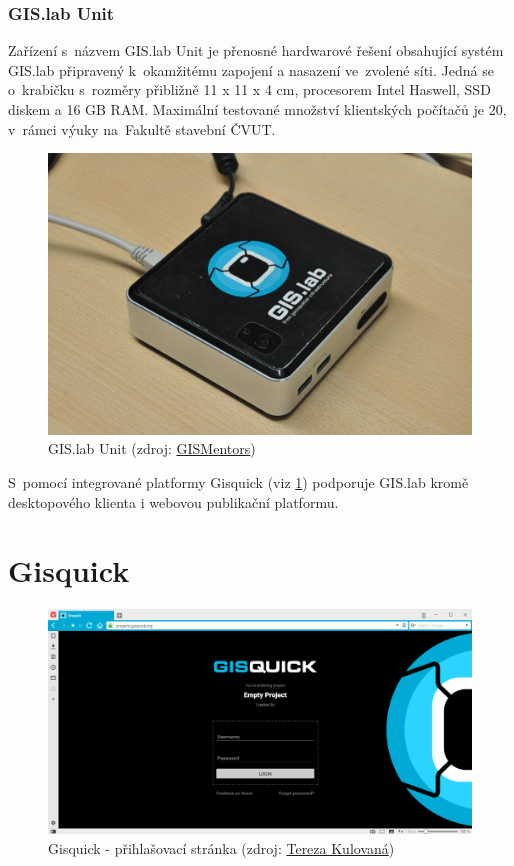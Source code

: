 \subsubsection{GIS.lab Unit}
\label{gislab-unit}
Zařízení s~názvem GIS.lab Unit je přenosné hardwarové řešení
obsahující systém GIS.lab připravený k~okamžitému zapojení a nasazení
ve~zvolené síti. Jedná se o~krabičku s~rozměry přibližně 11 x 11 x 4
cm, procesorem Intel Haswell, SSD diskem a 16 GB RAM. \cite{gislab-main} 
Maximální testované množství klientských počítačů je 20, v~rámci výuky na~Fakultě 
stavební ČVUT.

\begin{figure}[H] \centering
    \includegraphics[width=350pt]{./pictures/gislab-unit.jpg}
    \caption[GIS.lab Unit]{GIS.lab Unit (zdroj:
	\href{http://gismentors.cz/wp-content/uploads/2018/12/DSC_0043.jpg}{GISMentors})}
    \label{fig:gislab-unit}
\end{figure}

S~pomocí integrované platformy Gisquick (viz \ref{gisquick}) podporuje
GIS.lab kromě desktopového klienta i webovou publikační platformu.

\section{Gisquick}
\label{gisquick}

\begin{figure}[H] \centering
    \includegraphics[width=400pt]{./pictures/gisquick-welcome-screen.png}
    \caption[Gisquick - přihlašovací stránka]{Gisquick - přihlašovací stránka (zdroj:
	\href{}{Tereza Kulovaná})}
    \label{fig:gisquick-welcome}
\end{figure}

